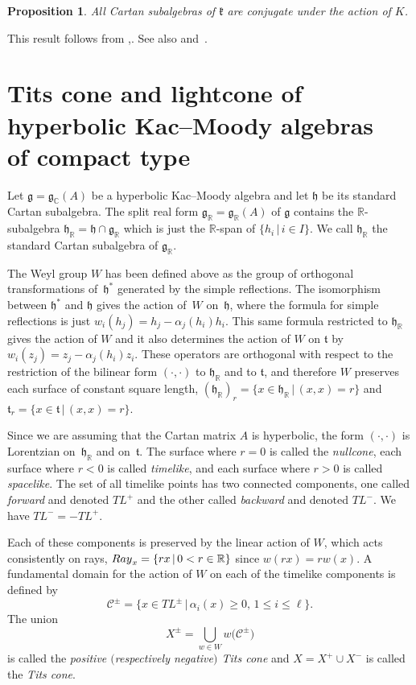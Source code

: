 \documentclass[11pt]{article}
\numberwithin{equation}{section}
\numberwithin{equation}{section}
\newtheorem{Proposition}[Theorem]{Proposition}
 { \theoremstyle{definition}
\newtheorem{Definition}[Theorem]{Definition}
\newtheorem{Remark}[Theorem]{Remark} }
\def\C{{\mathbb C}}
\def\R{\mathbb{R}}
\def\cC{\mathcal C}
\def\g{\mathfrak{g}}
\def\h{\mathfrak{h}}
\def\k{\mathfrak{k}}
\def\ft{\mathfrak{t}}
\begin{document}
\begin{Proposition}
\label{proposition:Cartancompactconjugate}
All Cartan subalgebras of $\k$ are conjugate under the action of $K$.
\end{Proposition}

This result follows from \cite[Proposition~8.1(iii)]{Caprace09},. See also \cite[Corollary 5.33]{KacWang92} and~\cite[Proposition 3.5]{KacPeterson87}.

\section[Tits cone and lightcone of hyperbolic Kac--Moody algebras of compact type]{Tits cone and lightcone of hyperbolic Kac--Moody algebras\\ of compact type}

Let $\g = \g_\C(A)$ be a hyperbolic Kac--Moody algebra and let $\h$ be its standard Cartan subalgebra.
The split real form $\g_\R = \g_\R(A)$ of $\g$ contains the $\R$-subalgebra $\h_{\R}=\h\cap \g_{\R}$ which is just the $\R$-span of $\{h_i \,|\, i\in I\}$. We call $\h_{\R}$ the standard Cartan subalgebra of $\g_\R$.

The Weyl group $W$ has been defined above as the group of orthogonal transformations of~$\h^*$ generated by the simple reflections. The isomorphism between $\h^*$ and $\h$ gives the action of~$W$ on~$\h$, where the formula for simple reflections is just $w_i(h_j) = h_j - \alpha_j(h_i)h_i$. This same formula restricted to $\h_{\R}$ gives the action of $W$ and it also determines the action of $W$ on $\ft$ by $w_i(z_j) = z_j - \alpha_j(h_i)z_i$. These operators are orthogonal with respect to the restriction of the bilinear form $(\cdot,\cdot)$ to $\h_\R$ and to $\ft$, and therefore $W$ preserves each surface of constant
square length, $(\h_\R)_r = \{x\in\h_\R \, |\, (x,x) = r\}$ and $\ft_r = \{x\in\ft \, |\, (x,x) = r\}$.

Since we are assuming that the Cartan matrix $A$ is hyperbolic, the form $(\cdot,\cdot)$ is Lorentzian on~$\h_\R$ and on~$\ft$. The surface where $r=0$ is called the {\it nullcone}, each surface where $r < 0$ is called {\it timelike}, and each surface where $r > 0$ is
called {\it spacelike}. The set of all timelike points has two connected components, one called {\it forward} and denoted $TL^+$ and the other called {\it backward} and denoted $TL^-$. We have $TL^- = - TL^+$.

Each of these components is preserved by the linear action of $W$, which acts consistently on rays, ${\rm Ray}_x = \{rx\, | \, 0 < r\in\R\}$ since
$w(rx) = r w(x)$. A fundamental domain for the action of $W$ on each of the timelike components is defined by
\[\cC^\pm = \{x\in TL^\pm\, |\, \alpha_i(x) \geq 0,\, 1\leq i\leq \ell \}.\]
The union
\[X^\pm = \bigcup_{w\in W} w\big(\cC^\pm\big)\]
is called the {\it positive $($respectively negative$)$ Tits cone} and $X = X^+\cup X^-$ is called the {\it Tits cone}.
\end{document}
